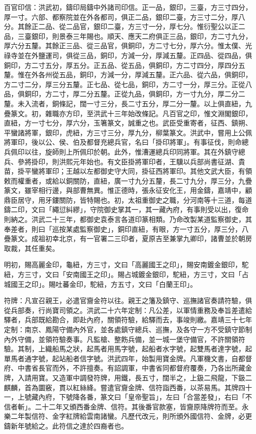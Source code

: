 百官印信：洪武初，鑄印局鑄中外諸司印信。正一品，銀印，三臺，方三寸四分，厚一寸。六部、都察院並在外各都司，俱正二品，銀印二臺，方三寸二分，厚八分。其餘正二品、從二品官，銀印二臺，方三寸一分，厚七分。惟衍聖公以正二品，三臺銀印，則景泰三年賜也。順天、應天二府俱正三品，銀印，方二寸九分，厚六分五釐。其餘正三品、從三品官，俱銅印，方二寸七分，厚六分。惟太僕、光祿寺並在外鹽運司，俱從三品，銅印，方減一分，厚減五釐。正四品、從四品，俱銅印，方二寸五分，厚五分。正五品、從五品，俱銅印，方二寸四分，厚四分五釐。惟在外各州從五品，銅印，方減一分，厚減五釐。正六品、從六品，俱銅印，方二寸二分，厚三分五釐。正七品、從七品，銅印，方二寸一分，厚三分。正從八品，俱銅印，方二寸，厚二分五釐。正從九品，俱銅印，方一寸九分，厚二分二釐。未入流者，銅條記，闊一寸三分，長二寸五分，厚二分一釐。以上俱直紐，九疊篆文。初，雜職亦方印，至洪武十三年始改條記。凡百官之印，惟文淵閣銀印，直紐，方一寸七分，厚六分，玉箸篆文，誠重之也。武臣受重寄者，征西、鎮朔、平蠻諸將軍，銀印，虎紐，方三寸三分，厚九分，柳葉篆文。洪武中，嘗用上公佩將軍印，後以公、侯、伯及都督充總兵官，名曰「掛印將軍」。有事征伐，則命總兵佩印以往，旋師則上所佩印於朝。此外，惟漕運總兵印同將軍。其在外鎮守總兵、參將掛印，則洪熙元年始也。有文臣掛將軍印者，王驥以兵部尚書征湖、貴苗，掛平蠻將軍印；王越以左都御史守大同，掛征西將軍印。其他文武大臣，有領敕而權重者，或給以銅關防，直紐，廣一寸九分五釐，長二寸九分，厚三分，九疊篆文，雖宰相行邊，與部曹無異。惟正德時，張永征安化王，用金鑄，嘉靖中，顧鼎臣居守，用牙鏤關防，皆特賜也。初，太祖重御史之職，分河南等十三道，每道鑄二印，文曰「繩愆糾繆」，守院御史掌其一，其一藏內府，有事則受以出，復命則納之。洪武二十三年，都御史袁泰言各道印篆相類。乃命改製某道監察御史，其奉差者，則曰「巡按某處監察御史」，銅印直紐，有眼，方一寸五分，厚三分，八疊篆文。成祖初幸北京，有一官署二三印者，夏原吉至兼掌九卿印，諸曹並於朝房取裁，其任重矣。

明初，賜高麗金印，龜紐，方三寸，文曰「高麗國王之印」，賜安南鍍金銀印，駝紐，方三寸，文曰「安南國王之印」。賜占城鍍金銀印，駝紐，方三寸，文曰「占城國王之印」。賜吐蕃金印，駝紐，方五寸，文曰「白蘭王印」。

符牌：凡宣召親王，必遣官齎金符以往。親王之籓及鎮守、巡撫諸官奏請符驗，俱從兵部奏，行尚寶司領之。洪武二十六年定制：凡公差，以軍情重務及奉旨差遣給驛者，兵部既給勘合，即赴內府，關領符驗，給驛而去，事竣則繳。嘉靖三十七年定制：南京、鳳陽守備內外官，並各處鎮守總兵、巡撫，及各守一方不受鎮守節制內外守備，並領符驗奏事。凡監槍、整飭兵備，並一城一堡守備官，不許關領符驗。其制，上織船馬之狀，起馬者用馬字號，起船者水字號，起雙馬者達字號，起單馬者通字號，起站船者信字號。洪武四年，始製用寶金牌。凡軍機文書，自都督府、中書省長官而外，不許擅奏。有詔調軍，中書省同都督府覆奏，乃各出所藏金牌，入請用寶。又造軍中調發符牌，用鐵，長五寸，闊半之，上鈒二飛龍，下鈒二麒麟，首為圜竅，貫以紅絲絳。嘗遣官齎金牌、信符詣西番，以茶易馬。其牌四十一，上號藏內府，下號降各番，篆文曰「皇帝聖旨」，左曰「合當差發」，右曰「不信者斬」。二十二年又頒西番金牌、信符。其後番官款塞，皆齎原降牌符而至。永樂二年製信符、金字紅牌給雲南諸蠻。凡歷代改元，則所頒外國信符、金牌，必更鑄新年號給之。此符信之達於四裔者也。

